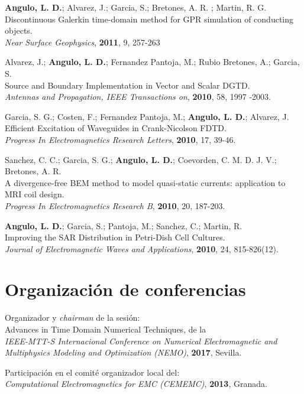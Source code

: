 \documentclass[a4paper,margin,line]{res}
\begin{document}
\begin{resume}
{\bf Angulo, L. D.}; Alvarez, J.; Garcia, S.; Bretones, A. R. ; Martin, R. G.\\
Discontinuous Galerkin time-domain method for GPR simulation of conducting objects.\\
{\it Near Surface Geophysics}, {\bf 2011}, 9, 257-263

Alvarez, J.; {\bf Angulo, L. D.}; Fernandez Pantoja, M.; Rubio Bretones, A.; Garcia, S.\\
Source and Boundary Implementation in Vector and Scalar DGTD.\\
{\it Antennas and Propagation, IEEE Transactions on}, {\bf 2010}, 58, 1997 -2003.

Garcia, S. G.; Costen, F.; Fernandez Pantoja, M.; {\bf Angulo, L. D.}; Alvarez, J.\\
Efficient Excitation of Waveguides in Crank-Nicolson FDTD.\\
{\it Progress In Electromagnetics Research Letters}, {\bf 2010}, 17, 39-46.

Sanchez, C. C.; Garcia, S. G.; {\bf Angulo, L. D.}; Coevorden, C. M. D. J. V.; Bretones, A. R.\\
A divergence-free BEM method to model quasi-static currents: application to MRI coil design.\\
{\it Progress In Electromagnetics Research B}, {\bf 2010}, 20, 187-203.

{\bf Angulo, L. D.}; Garcia, S.; Pantoja, M.; Sanchez, C.; Martin, R.\\ 
Improving the SAR Distribution in Petri-Dish Cell Cultures.\\
{\it Journal of Electromagnetic Waves and Applications}, {\bf 2010}, 24, 815-826(12).

\section{\sc Organización de conferencias}
\begin{minipage}{\textwidth}
  Organizador y \textit{chairman} de la sesión:\\
  Advances in Time Domain Numerical Techniques, de la\\
  \textit{IEEE-MTT-S Internacional Conference on Numerical Electromagnetic and Multiphysics Modeling and Optimization (NEMO)}, \textbf{2017}, Sevilla.
\end{minipage}

\begin{minipage}{\textwidth}
  Participación en el comité organizador local del:\\
  \textit{Computational Electromagnetics for EMC (CEMEMC)}, \textbf{2013}, Granada.
\end{minipage}


\end{resume}
\end{document}
